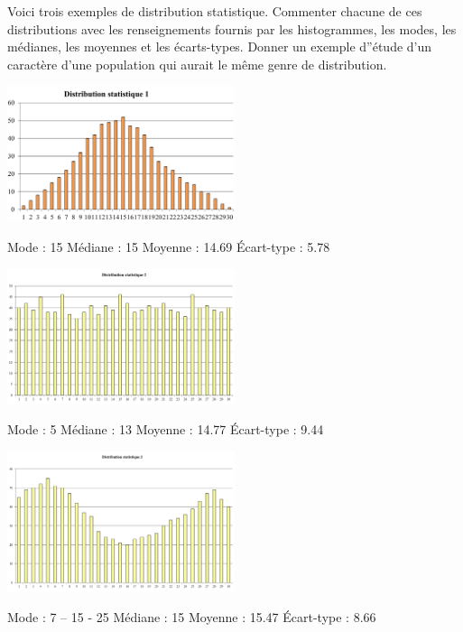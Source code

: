 \begin{exercice}
Voici trois exemples de distribution statistique. Commenter chacune de ces distributions avec les renseignements fournis par les histogrammes, les modes, les médianes, les moyennes et les écarts-types. Donner un exemple d''étude d'un caractère d'une population qui aurait le même genre de distribution.
\begin{center}
\includegraphics[width = 0.5\textwidth]{statistiques/image/graphique1.png}
\end{center}
Mode : 15
Médiane : 15
Moyenne : 14.69
Écart-type : 5.78
\begin{center}
\includegraphics[width = 0.5\textwidth]{statistiques/image/graphique2.png}
\end{center}
Mode : 5
Médiane : 13
Moyenne : 14.77
Écart-type : 9.44
\begin{center}
\includegraphics[width = 0.5\textwidth]{statistiques/image/graphique3.png}
\end{center}
Mode : 7 – 15 - 25
Médiane : 15
Moyenne : 15.47
Écart-type : 8.66
\end{exercice}

